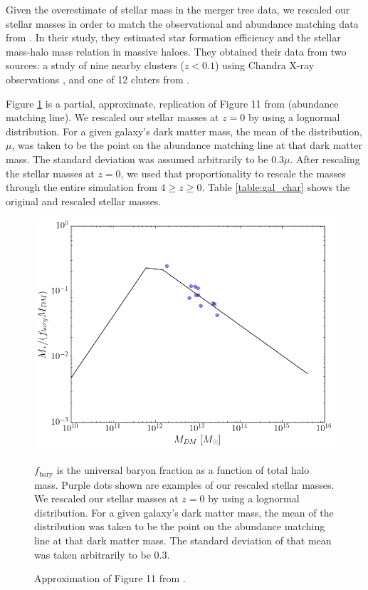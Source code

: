 \documentclass[fleqn,usenatbib,useAMS]{mnras}
\begin{document}
Given the overestimate of stellar mass in the merger tree data, we rescaled our stellar masses in order to match the observational and abundance matching data from \citet{2018AstL...44....8K}. In their study, they estimated star formation efficiency and the stellar mass-halo mass relation in massive haloes.  They obtained their data from two sources: a study of nine nearby clusters ($z<0.1$) using Chandra X-ray observations \citep{2009ApJ...692.1033V}, and one of 12 cluters from \citet{2013ApJ...778...14G}.

Figure \ref{fig:stellar1} is a partial, approximate, replication of Figure 11 from \citet{2018AstL...44....8K} (abundance matching line).  We rescaled our stellar masses at $z=0$ by using a lognormal distribution.  For a given galaxy's dark matter mass, the mean of the distribution, $\mu$, was taken to be the point on the abundance matching line at that dark matter mass.  The standard deviation was assumed arbitrarily to be $0.3\mu$.  After rescaling the stellar masses at $z=0$, we used that proportionality to rescale the masses through the entire simulation from $4\geq z \geq0$.  Table \ref{table:gal_char} shows the original and rescaled stellar masses.

\begin{figure}
\includegraphics[width=1.0\columnwidth]{plots/stellar_to_halo_ratio.png}
\caption{Approximation of Figure 11 from \citet{2018AstL...44....8K}.}  $f_\mathrm{bary}$ is the universal baryon fraction as a function of total halo mass.  Purple dots shown are examples of our rescaled stellar masses.  We rescaled our stellar masses at $z=0$ by using a lognormal distribution.  For a given galaxy's dark matter mass, the mean of the distribution was taken to be the point on the abundance matching line at that dark matter mass.  The standard deviation of that mean was taken arbitrarily to be 0.3.
\label{fig:stellar1}
\end{figure}
\end{document}
